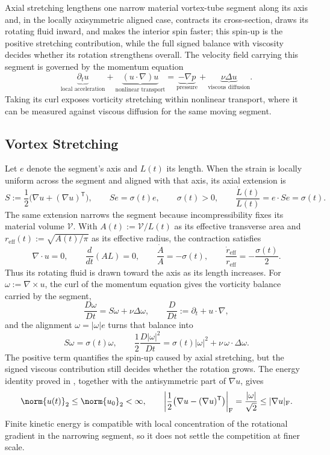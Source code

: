 
Axial stretching lengthens one narrow material vortex-tube segment along its axis and, in the locally axisymmetric aligned case, contracts its cross-section, draws its rotating fluid inward, and makes the interior spin faster; this spin-up is the positive stretching contribution, while the full signed balance with viscosity decides whether its rotation strengthens overall.
The velocity field carrying this segment is governed by the momentum equation
\[
  \underbrace{\partial_t u}_{\text{local acceleration}}
  +
  \underbrace{(u\cdot\nabla)u}_{\text{nonlinear transport}}
  =
  \underbrace{-\nabla p}_{\text{pressure}}
  +
  \underbrace{\nu\Delta u}_{\text{viscous diffusion}}.
\]
Taking its curl exposes vorticity stretching within nonlinear transport, where it can be measured against viscous diffusion for the same moving segment.

\subsection{Vortex Stretching}\label{sub:ThePerfectlyStretchingVortex}

Let $e$ denote the segment's axis and $L(t)$ its length.
When the strain is locally uniform across the segment and aligned with that axis, its axial extension is
\[
  S:=\frac12\bigl(\nabla u+(\nabla u)^{\mathsf T}\bigr),
  \qquad
  Se=\sigma(t)e,
  \qquad
  \sigma(t)>0,
  \qquad
  \frac{\dot L(t)}{L(t)}
  =
  e\cdot Se
  =
  \sigma(t).
\]
The same extension narrows the segment because incompressibility fixes its material volume $\mathcal V$.
With $A(t):=\mathcal V/L(t)$ as its effective transverse area and $r_{\mathrm{eff}}(t):=\sqrt{A(t)/\pi}$ as its effective radius, the contraction satisfies
\[
  \nabla\cdot u=0,
  \qquad
  \frac{d}{dt}(A L)=0,
  \qquad
  \frac{\dot A}{A}=-\sigma(t),
  \qquad
  \frac{\dot r_{\mathrm{eff}}}{r_{\mathrm{eff}}}
  =
  -\frac{\sigma(t)}{2}.
\]
Thus its rotating fluid is drawn toward the axis as its length increases.
For $\omega:=\nabla\times u$, the curl of the momentum equation gives the vorticity balance carried by the segment,
\[
  \frac{D\omega}{Dt}
  =
  S\omega+\nu\Delta\omega,
  \qquad
  \frac{D}{Dt}
  :=
  \partial_t+u\cdot\nabla,
\]
and the alignment $\omega=|\omega|e$ turns that balance into
\[
  S\omega
  =
  \sigma(t)\omega,
  \qquad
  \frac12\frac{D|\omega|^2}{Dt}
  =
  \sigma(t)|\omega|^2
  +
  \nu\,\omega\cdot\Delta\omega.
\]
The positive term quantifies the spin-up caused by axial stretching, but the signed viscous contribution still decides whether the rotation grows.
The energy identity proved in , together with the antisymmetric part of $\nabla u$, gives
\[
  \norm{u(t)}_2
  \leq
  \norm{u_0}_2
  <\infty,
  \qquad
  \left|\frac12\bigl(\nabla u-(\nabla u)^{\mathsf T}\bigr)\right|_{\mathrm F}
  =
  \frac{|\omega|}{\sqrt2}
  \leq
  |\nabla u|_{\mathrm F}.
\]
Finite kinetic energy is compatible with local concentration of the rotational gradient in the narrowing segment, so it does not settle the competition at finer scale.

